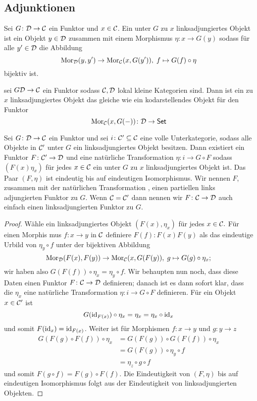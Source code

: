 \subsection{Adjunktionen}
\begin{Def}
    Sei \(G\colon\mathcal{D}\to\mathcal{C}\) ein Funktor und \(x\in\mathcal{C}\). Ein unter \(G\) zu \(x\) linksadjungiertes Objekt ist ein Objekt \(y\in\mathcal{D}\) zusammen mit einem Morphismus \(\eta\colon x\to G(y)\) sodass für alle \(y'\in\mathcal{D}\) die Abbildung 
    \[\operatorname{Mor}_{\mathcal{D}}(y,y')\to\operatorname{Mor}_{\mathcal{C}}(x,G(y')), \; f\mapsto G(f)\circ\eta\] bijektiv ist.
\end{Def}
\begin{Bem}
    sei \(G\mathcal{D}\to\mathcal{C}\) ein Funktor sodass \(\mathcal{C},\mathcal{D}\) lokal kleine Kategorien sind. Dann ist ein zu \(x\) linksadjungiertes Objekt das gleiche wie ein kodarstellendes Objekt für den Funktor \[\operatorname{Mor}_{\mathcal{C}}(x,G(-))\colon \mathcal{D}\to\mathsf{Set}\]
\end{Bem}
\begin{Satz}\label{Satz:AdjFun}
    Sei \(G\colon\mathcal{D}\to\mathcal{C}\) ein Funktor und sei \(i\colon \mathcal{C}'\subseteq \mathcal{C}\) eine volle Unterkategorie, sodass alle Objekte in \(\mathcal{C}'\) unter \(G\) ein linksadjungiertes Objekt besitzen. Dann existiert ein Funktor \(F\colon \mathcal{C}'\to\mathcal{D}\) und eine natürliche Transformation \(\eta\colon i\to G\circ F\) sodass \((F(x) \eta_x)\) für jedes \(x\in\mathcal{C}\) ein unter \(G\) zu \(x\) linksadjungiertes Objekt ist. Das Paar
 \((F,\eta )\) ist eindeutig bis auf eindeutigen Isomorphismus.
 Wir nennen \(F\), zusammen mit der natürlichen Transformation , einen partiellen links
adjungierten Funktor zu \(G\). Wenn \(\mathcal{C}= \mathcal{C}'\) dann nennen wir \(F\colon \mathcal{C}\to \mathcal{D}\) auch einfach einen
 linksadjungierten Funktor zu \(G\).
\end{Satz}
\begin{proof}
    Wähle ein linksadjungiertes Objekt \((F(x), \eta_x)\) für jedes \(x\in\mathcal{C}.\) Für einen Morphis
mus \(f\colon x\to y\) in \(\mathcal{C}\) definiere \(F(f)\colon F(x) F(y)\) als das eindeutige Urbild von \(\eta_y\circ f\) unter
 der bijektiven Abbildung
 \[\operatorname{Mor}_{\mathcal{D}} (F(x),F(y))\to \operatorname{Mor}_{\mathcal{C}} (x,G(F(y)),\; g\mapsto G(g)\circ \eta_x;\]
 wir haben also \(G(F(f))\circ\eta_x = \eta_y\circ f.\)
 Wir behaupten nun noch, dass diese Daten einen Funktor $F\colon \mathcal{C}
 \to \mathcal{D}$ definieren; danach
 ist es dann sofort klar, dass die \(\eta_x\) eine natürliche Transformation \(\eta\colon i\to G\circ F\) definieren.
 Für ein Objekt \(x\in\mathcal{C}'\) ist
\[ G(\mathrm{id}_{F(x)})\circ\eta_x = \eta_x= \eta_x \circ\mathrm{id}_x\]
 und somit \(F(\mathrm{id}_x) = \mathrm{id}_{F(x)}\). Weiter ist für Morphismen \(f\colon x\to y\) und \(g\colon  y\to  z\)
\begin{align*}
    G(F(g)\circ F(f))\circ \eta_x&=G(F(g))\circ G(F(f))\circ\eta_x\\
 &=G(F(g))\circ\eta_y\circ f\\
 &= \eta_z\circ g\circ f
\end{align*} 
 und somit \(F(g\circ f) = F(g)\circ F(f).\)
 Die Eindeutigkeit von \((F,\eta)\) bis auf eindeutigen Isomorphismus folgt aus der Eindeutigkeit
 von linksadjungierten Objekten.
\end{proof}
